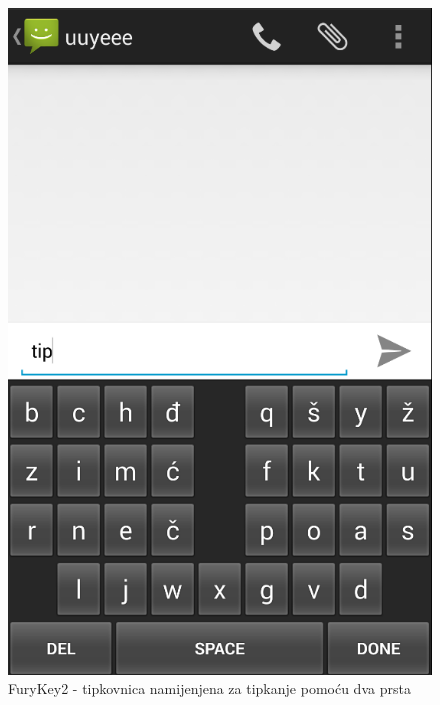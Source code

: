 \documentclass[times, utf8, zavrsni]{fer}
\begin{document}
\begin{figure}[htb]
\begin{minipage}[b]{0.40\textwidth}
    \includegraphics[width=\textwidth]{img/FuryKey2.PNG}
    \caption{FuryKey2 - tipkovnica namijenjena za tipkanje pomoću dva prsta}
    \label{fig:FuryKey2}
  \end{minipage}
\end{figure}
\end{document}
